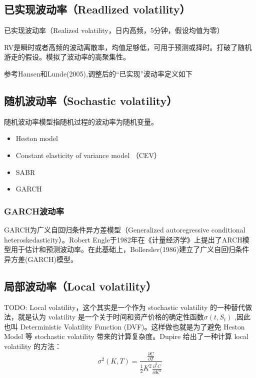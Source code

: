 \documentclass[11pt]{article}
\begin{document}
\subsection{已实现波动率（Readlized volatility）}

已实现波动率（Realized volatility，日内高频，5分钟，假设均值为零）

RV是瞬时或者高频的波动离散率，均值足够低，可用于预测或择时。打破了随机游走的假设。模拟了波动率的高聚集性。

参考Hansen和Lunde(2005),调整后的“已实现”波动率定义如下


\subsection{随机波动率（Sochastic volatility）}

随机波动率模型指随机过程的波动率为随机变量。
\begin{itemize}
    \setlength{\itemsep}{0em}
    \item Heston model
    \item Constant elasticity of variance model  （CEV）
    \item SABR
    \item GARCH
\end{itemize}

\subsubsection{GARCH波动率}

GARCH为广义自回归条件异方差模型（Generalized autoregressive conditional heteroskedasticity）。Robert Engle于1982年在《计量经济学》上提出了ARCH模型用于估计和预测波动率。在此基础上，Bollerslev(1986)建立了广义自回归条件异方差(GARCH)模型。

\subsection{局部波动率（Local volatility）}

TODO: Local volatility，这个其实是一个作为 stochastic volatility 的一种替代做法，就是认为 volatility 是一个关于时间和资产价格的确定性函数$\sigma(t,S_t)$ ,因此也叫 Deterministic Volatility Function (DVF)。这样做也就是为了避免 Heston Model 等 stochastic volatility 带来的计算复杂度。Dupire 给出了一种计算 local volatility 的方法：
\begin{equation*}
    \sigma^2(K,T) = \frac{\frac{\partial C}{\partial T}}{\frac{1}{2} K^2 \frac{\partial^2 C}{\partial K^2}}
\end{equation*}
\end{document}

